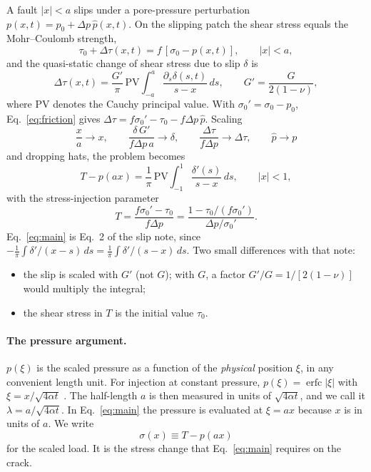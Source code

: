 \documentclass[12pt]{article}
\newcommand{\PV}{\mathrm{PV}\!\!}
\newcommand{\erfc}{\operatorname{erfc}}
\begin{document}
A fault $|x|<a$ slips under a pore-pressure perturbation
$p(x,t) = p_0 + \Delta p\, \hat p(x,t)$. On the slipping patch the shear stress
equals the Mohr--Coulomb strength,
\begin{equation}\label{eq:friction}
	\tau_0 + \Delta\tau(x,t) = f\,[\sigma_0 - p(x,t)], \qquad |x| < a,
\end{equation}
and the quasi-static change of shear stress due to slip $\delta$ is
\begin{equation}\label{eq:elastic}
	\Delta\tau(x,t) = \frac{G'}{\pi}\,\PV\int_{-a}^{a}
	\frac{\partial_s\delta(s,t)}{s-x}\,ds,
	\qquad G' = \frac{G}{2(1-\nu)},
\end{equation}
where $\PV$ denotes the Cauchy principal value. With
$\sigma_0' = \sigma_0 - p_0$, Eq.~\eqref{eq:friction} gives
$\Delta\tau = f\sigma_0' - \tau_0 - f\Delta p\,\hat p$. Scaling
\begin{equation*}
	\frac{x}{a} \to x, \qquad
	\frac{\delta\, G'}{f\Delta p\, a} \to \delta, \qquad
	\frac{\Delta\tau}{f\Delta p} \to \Delta\tau, \qquad
	\hat p \to p
\end{equation*}
and dropping hats, the problem becomes
\begin{equation}\label{eq:main}
	\boxed{\;T - p(a x) = \frac{1}{\pi}\,\PV\int_{-1}^{1}
		\frac{\delta'(s)}{s-x}\,ds, \qquad |x|<1,\;}
\end{equation}
with the stress-injection parameter \parencite{BhattacharyaViesca2019}
\begin{equation}\label{eq:T}
	T = \frac{f\sigma_0' - \tau_0}{f\Delta p}
	= \frac{1 - \tau_0/(f\sigma_0')}{\Delta p/\sigma_0'}.
\end{equation}
Eq.~\eqref{eq:main} is Eq.~2 of the slip note, since
$-\frac1\pi\int \delta'/(x-s)\,ds = \frac1\pi\int\delta'/(s-x)\,ds$. Two small
differences with that note:
\begin{itemize}
	\item the slip is scaled with $G'$ (not $G$); with $G$, a factor
	      $G'/G = 1/[2(1-\nu)]$ would multiply the integral;
	\item the shear stress in $T$ is the initial value $\tau_0$.
\end{itemize}

\paragraph{The pressure argument.} $p(\xi)$ is the scaled pressure as a function
of the \emph{physical} position $\xi$, in any convenient length unit. For
injection at constant pressure, $p(\xi) = \erfc|\xi|$ with
$\xi = x/\sqrt{4\alpha t}$ \parencite{BhattacharyaViesca2019}. The half-length
$a$ is then measured in units of $\sqrt{4\alpha t}$, and we call it
$\lambda = a/\sqrt{4\alpha t}$. In Eq.~\eqref{eq:main} the pressure is evaluated
at $\xi = a x$ because $x$ is in units of $a$. We write
\begin{equation*}
	\sigma(x) \equiv T - p(ax)
\end{equation*}
for the scaled load. It is the stress change that Eq.~\eqref{eq:main} requires
on the crack.
\end{document}
